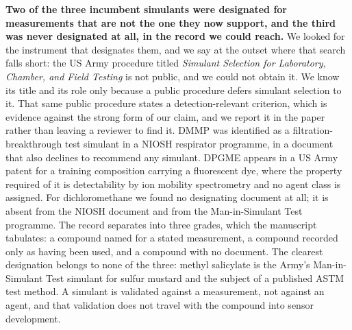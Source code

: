\documentclass[11pt,a4paper]{article}
\begin{document}
\textbf{Two of the three incumbent simulants were designated for measurements
that are not the one they now support, and the third was never designated at
all, in the record we could reach.} We looked for the instrument that
designates them, and we say at the outset where that search falls short: the US
Army procedure titled \emph{Simulant Selection for Laboratory, Chamber, and
Field Testing} is not public, and we could not obtain it. We know its title and
its role only because a public procedure defers simulant selection to it. That
same public procedure states a detection-relevant criterion, which is evidence
against the strong form of our claim, and we report it in the paper rather than
leaving a reviewer to find it. DMMP was identified as a filtration-breakthrough test simulant in a NIOSH
respirator programme, in a document that also declines to recommend any
simulant. %
DPGME appears in a US Army patent for a
training composition carrying a fluorescent dye, where the property required
of it is detectability by ion mobility spectrometry and no agent class is
assigned. For dichloromethane we found no designating document
at all; it is absent from the NIOSH document and from the Man-in-Simulant
Test programme. The record separates into three grades, which the manuscript
tabulates: a compound named for a stated measurement, a compound recorded only
as having been used, and a compound with no document. The clearest designation
belongs to none of the three: methyl salicylate is the Army's Man-in-Simulant
Test simulant for sulfur mustard and the subject of a published ASTM test
method. A simulant is validated against a
measurement, not against an agent, and that validation does not travel with the
compound into sensor development.
\end{document}
